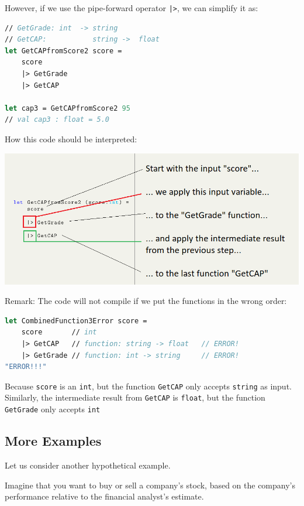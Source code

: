 \documentclass[12pt]{article}
\begin{document}
However, if we use the pipe-forward operator \texttt{|>}, we can simplify it as:
\begin{lstlisting}[language=FSharp]
// GetGrade: int  -> string
// GetCAP:           string ->  float
let GetCAPfromScore2 score =
    score               
    |> GetGrade         
    |> GetCAP   

let cap3 = GetCAPfromScore2 95
// val cap3 : float = 5.0
\end{lstlisting}
How this code should be interpreted:
\begin{center}
\includegraphics[width=16cm]{pictures/picture23.png}
\end{center}
Remark: The code will not compile if we put the functions in the wrong order:
\begin{lstlisting}[language=FSharp]
let CombinedFunction3Error score =
    score       // int
    |> GetCAP   // function: string -> float   // ERROR! 
    |> GetGrade // function: int -> string     // ERROR!
"ERROR!!!"
\end{lstlisting}
Because \texttt{score} is an \texttt{int}, but the function \texttt{GetCAP} only accepts  \texttt{string} as input. Similarly, the intermediate result from \texttt{GetCAP} is \texttt{float}, but the function \texttt{GetGrade} only accepts \texttt{int}
\subsection{More Examples}
Let us consider another hypothetical example. 

Imagine that you want to buy or sell a company's stock, based on the company's performance relative to the financial analyst's estimate.
\end{document}
